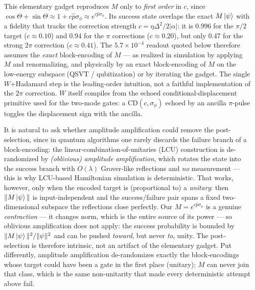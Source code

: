 \documentclass[11pt]{article}
\begin{document}
This elementary gadget reproduces $M$ only to \emph{first order} in $c$, since
$\cos\Theta+\sin\Theta\approx1+c\hat p\sigma_\phi\approx e^{c\hat p\sigma_\phi}$. Its success state overlaps the exact $M\ket\psi$ with a fidelity that tracks
the correction strength $c=\eta\Delta^2/2|\alpha|$: it is $0.996$ for the $\pi/2$ target ($c\approx0.10$)
and $0.94$ for the $\pi$ corrections ($c\approx0.20$), but only $0.47$ for the strong $2\pi$
correction ($c\approx0.41$). The $5.7\times10^{-4}$ readout
quoted below therefore assumes the \emph{exact} block-encoding of $M$ --- as realized in simulation
by applying $M$ and renormalizing, and physically by an exact block-encoding of $M$ on the low-energy
subspace (QSVT / qubitization) or by iterating the gadget. The single $W$+Hadamard step is the
leading-order intuition, not a faithful implementation of the $2\pi$ correction. $W$ itself compiles
from the echoed conditional-displacement primitive used for the two-mode gates: a
$\mathrm{CD}(c,\sigma_\phi)$ echoed by an ancilla $\pi$-pulse toggles the displacement sign with the
ancilla.

It is natural to ask whether amplitude amplification could remove the post-selection, since in quantum
algorithms one rarely discards the failure branch of a block-encoding: the linear-combination-of-unitaries (LCU)
construction is de-randomized by \emph{(oblivious) amplitude amplification}, which rotates the state
into the success branch with $O(\lambda)$ Grover-like reflections and \emph{no} measurement --- this
is why LCU-based Hamiltonian simulation is deterministic. That works, however, only when the encoded
target is (proportional to) a \emph{unitary}: then $\|M\ket\psi\|$ is input-independent and the
success/failure pair spans a fixed two-dimensional subspace the reflections close perfectly. Our
$M=e^{c\hat p\sigma_\phi}$ is a genuine \emph{contraction} --- it changes norm, which is the entire
source of its power --- so oblivious amplification does not apply: the success probability is bounded
by $\|M\ket\psi\|^2/\|\psi\|^2$ and can be pushed \emph{toward}, but never \emph{to}, unity. The
post-selection is therefore intrinsic, not an artifact of the elementary gadget. Put differently,
amplitude amplification de-randomizes exactly the block-encodings whose target could have been a gate
in the first place (unitary); $M$ can never join that class, which is the same non-unitarity that
made every deterministic attempt above fail.
\end{document}
